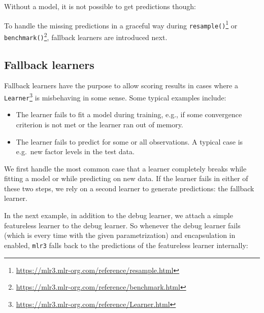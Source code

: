 \documentclass[12pt,]{scrbook}
\newenvironment{Shaded}{}{}
\newcommand{\KeywordTok}[1]{\textcolor[rgb]{0.00,0.00,1.00}{#1}}
\newcommand{\NormalTok}[1]{#1}
\newcommand{\OperatorTok}[1]{#1}
\providecommand{\tightlist}{%
  \setlength{\itemsep}{0pt}\setlength{\parskip}{0pt}}
\renewcommand{\href}[2]{#2\footnote{\url{#1}}}
\begin{document}
Without a model, it is not possible to get predictions though:

\begin{Shaded}
\end{Shaded}

To handle the missing predictions in a graceful way during \href{https://mlr3.mlr-org.com/reference/resample.html}{\texttt{resample()}} or \href{https://mlr3.mlr-org.com/reference/benchmark.html}{\texttt{benchmark()}}, fallback learners are introduced next.

\hypertarget{fallback-learners}{%
\subsection{Fallback learners}\label{fallback-learners}}

Fallback learners have the purpose to allow scoring results in cases where a \href{https://mlr3.mlr-org.com/reference/Learner.html}{\texttt{Learner}} is misbehaving in some sense.
Some typical examples include:

\begin{itemize}
\tightlist
\item
  The learner fails to fit a model during training, e.g., if some convergence criterion is not met or the learner ran out of memory.
\item
  The learner fails to predict for some or all observations.
  A typical case is e.g.~new factor levels in the test data.
\end{itemize}

We first handle the most common case that a learner completely breaks while fitting a model or while predicting on new data.
If the learner fails in either of these two steps, we rely on a second learner to generate predictions: the fallback learner.

In the next example, in addition to the debug learner, we attach a simple featureless learner to the debug learner.
So whenever the debug learner fails (which is every time with the given parametrization) and encapsulation in enabled, \texttt{mlr3} falls back to the predictions of the featureless learner internally:
\end{document}
